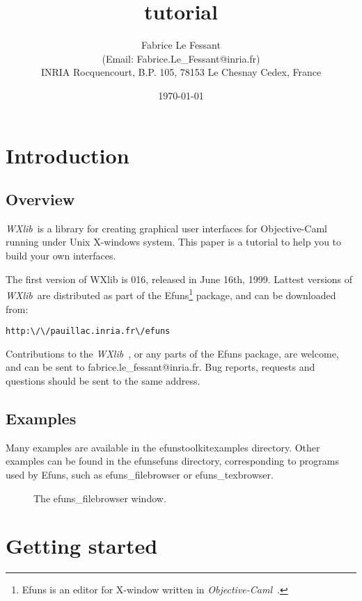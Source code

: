 \documentclass{report}
\title{\wxlib tutorial}
\author{Fabrice Le Fessant\\
    (Email: Fabrice.Le\_Fessant@inria.fr)\\
    INRIA Rocquencourt, B.P. 105, 78153 Le Chesnay Cedex, France }
\date{\today}
\newcommand{\ocaml}{\emph{Objective-Caml}~}
\newcommand{\wxlib}{\emph{WXlib}~}
\newcommand{\psfigure}[3]{ %
  \begin{quote}\let\normalsize\small\caption{#3\label{fig:#2}}\end{quote}
  }
\begin{document}
\maketitle
\tableofcontents

\chapter{Introduction}

\section{Overview}

\wxlib is a library for creating graphical user interfaces for Objective-Caml
running under Unix X-windows system. This paper is a tutorial to help you 
to build your own interfaces.

 The first version of WXlib is 016, released in June 16th, 1999. Lattest
versions of \wxlib are distributed as part of the Efuns\footnote{ Efuns is an
editor for X-window written in \ocaml.} package, and can be downloaded from:

\begin{verbatim}
http:\/\/pauillac.inria.fr\/efuns
\end{verbatim}

  Contributions to the \wxlib, or any parts of the Efuns package, are 
welcome, and can be sent to {\sf fabrice.le\_fessant@inria.fr}. Bug 
reports, requests and questions should be sent to the same address.

\section{Examples}

  Many examples are available in the {\sf efuns\/toolkit\/examples} 
directory. Other examples can be found in the {\sf efuns\/efuns} directory, 
corresponding to programs used by Efuns, such as {\sf efuns\_filebrowser} 
or {\sf efuns\_texbrowser}.

\begin{figure}[t]
\begin{center}
\psfigure{1}{browser}{The efuns\_filebrowser window.}
\end{center}
\end{figure}

\chapter{Getting started}
\end{document}
